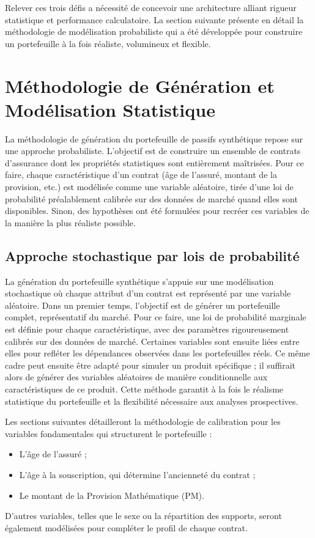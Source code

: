 Relever ces trois défis a nécessité de concevoir une architecture alliant rigueur statistique et performance calculatoire. La section suivante présente en détail la méthodologie de modélisation probabiliste qui a été développée pour construire un portefeuille à la fois réaliste, volumineux et flexible.

\section{Méthodologie de Génération et Modélisation Statistique}

La méthodologie de génération du portefeuille de passifs synthétique repose sur une approche probabiliste. L'objectif est de construire un ensemble de contrats d'assurance dont les propriétés statistiques sont entièrement maîtrisées. Pour ce faire, chaque caractéristique d'un contrat (âge de l'assuré, montant de la provision, etc.) est modélisée comme une variable aléatoire, tirée d'une loi de probabilité préalablement calibrée sur des données de marché quand elles sont disponibles. Sinon, des hypothèses ont été formulées pour recréer ces variables de la manière la plus réaliste possible.


\subsection{Approche stochastique par lois de probabilité}

La génération du portefeuille synthétique s'appuie sur une modélisation stochastique où chaque attribut d'un contrat est représenté par une variable aléatoire. Dans un premier temps, l'objectif est de générer un portefeuille complet, représentatif du marché. Pour ce faire, une loi de probabilité marginale est définie pour chaque caractéristique, avec des paramètres rigoureusement calibrés sur des données de marché. Certaines variables sont ensuite liées entre elles pour refléter les dépendances observées dans les portefeuilles réels. Ce même cadre peut ensuite être adapté pour simuler un produit spécifique ; il suffirait alors de générer des variables aléatoires de manière conditionnelle aux caractéristiques de ce produit. Cette méthode garantit à la fois le réalisme statistique du portefeuille et la flexibilité nécessaire aux analyses prospectives.

Les sections suivantes détailleront la méthodologie de calibration pour les variables fondamentales qui structurent le portefeuille :
\begin{itemize}
    \item L'âge de l'assuré ;
    \item L'âge à la souscription, qui détermine l'ancienneté du contrat ;
    \item Le montant de la Provision Mathématique (PM).
\end{itemize}
D'autres variables, telles que le sexe ou la répartition des supports, seront également modélisées pour compléter le profil de chaque contrat.


